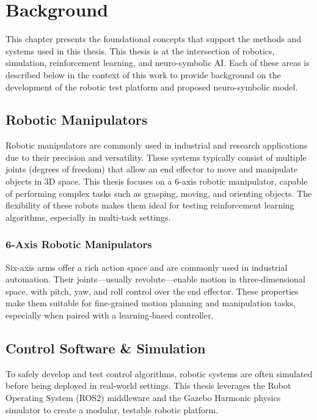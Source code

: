 \chapter{Background} \label{ch:background}

This chapter presents the foundational concepts that support the methods and systems used in this thesis. This thesis is at the intersection of robotics, simulation, reinforcement learning, and neuro-symbolic AI. Each of these areas is described below in the context of this work to provide background on the development of the robotic test platform and proposed neuro-symbolic model.

\section{Robotic Manipulators} \label{se:robotic_manipulators}
Robotic manipulators are commonly used in industrial and research applications due to their precision and versatility. These systems typically consist of multiple joints (degrees of freedom) that allow an end effector to move and manipulate objects in 3D space. This thesis focuses on a 6-axis robotic manipulator, capable of performing complex tasks such as grasping, moving, and orienting objects. The flexibility of these robots makes them ideal for testing reinforcement learning algorithms, especially in multi-task settings.

\subsection{6-Axis Robotic Manipulators} \label{ss:6axis}
Six-axis arms offer a rich action space and are commonly used in industrial automation. Their joints—usually revolute—enable motion in three-dimensional space, with pitch, yaw, and roll control over the end effector. These properties make them suitable for fine-grained motion planning and manipulation tasks, especially when paired with a learning-based controller.

\section{Control Software \& Simulation} \label{se:simulation}
To safely develop and test control algorithms, robotic systems are often simulated before being deployed in real-world settings. This thesis leverages the Robot Operating System (ROS2) middleware and the Gazebo Harmonic physics simulator to create a modular, testable robotic platform.

